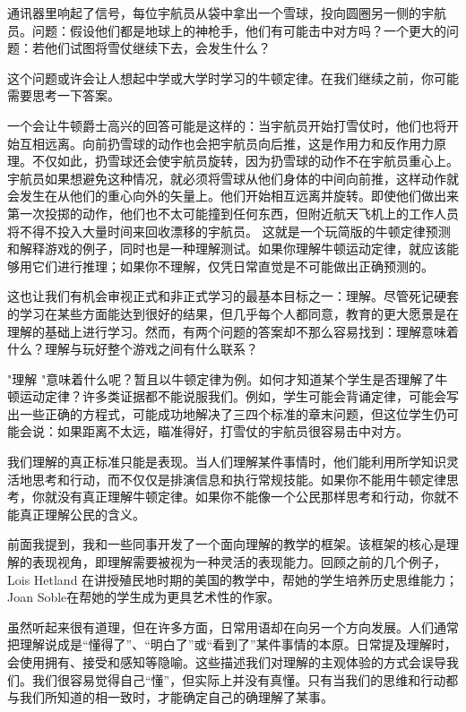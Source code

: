 通讯器里响起了信号，每位宇航员从袋中拿出一个雪球，投向圆圈另一侧的宇航员。问题：假设他们都是地球上的神枪手，他们有可能击中对方吗？一个更大的问题：若他们试图将雪仗继续下去，会发生什么？

这个问题或许会让人想起中学或大学时学习的牛顿定律。在我们继续之前，你可能需要思考一下答案。

一个会让牛顿爵士高兴的回答可能是这样的：当宇航员开始打雪仗时，他们也将开始互相远离。向前扔雪球的动作也会把宇航员向后推，这是作用力和反作用力原理。不仅如此，扔雪球还会使宇航员旋转，因为扔雪球的动作不在宇航员重心上。宇航员如果想避免这种情况，就必须将雪球从他们身体的中间向前推，这样动作就会发生在从他们的重心向外的矢量上。他们开始相互远离并旋转。即使他们做出来第一次投掷的动作，他们也不太可能撞到任何东西，但附近航天飞机上的工作人员将不得不投入大量时间来回收漂移的宇航员。
这就是一个玩简版的牛顿定律预测和解释游戏的例子，同时也是一种理解测试。如果你理解牛顿运动定律，就应该能够用它们进行推理；如果你不理解，仅凭日常直觉是不可能做出正确预测的。

这也让我们有机会审视正式和非正式学习的最基本目标之一：理解。尽管死记硬套的学习在某些方面能达到很好的结果，但几乎每个人都同意，教育的更大愿景是在理解的基础上进行学习。然而，有两个问题的答案却不那么容易找到：理解意味着什么？理解与玩好整个游戏之间有什么联系？

"理解 "意味着什么呢？暂且以牛顿定律为例。如何才知道某个学生是否理解了牛顿运动定律？许多类证据都不能说服我们。例如，学生可能会背诵定律，可能会写出一些正确的方程式，可能成功地解决了三四个标准的章末问题，但这位学生仍可能会说：如果距离不太远，瞄准得好，打雪仗的宇航员很容易击中对方。

我们理解的真正标准只能是表现。当人们理解某件事情时，他们能利用所学知识灵活地思考和行动，而不仅仅是排演信息和执行常规技能。如果你不能用牛顿定律思考，你就没有真正理解牛顿定律。如果你不能像一个公民那样思考和行动，你就不能真正理解公民的含义。

前面我提到，我和一些同事开发了一个面向理解的教学的框架。该框架的核心是理解的表现视角，即理解需要被视为一种灵活的表现能力。回顾之前的几个例子，Lois Hetland 在讲授殖民地时期的美国的教学中，帮她的学生培养历史思维能力；Joan Soble在帮她的学生成为更具艺术性的作家。

虽然听起来很有道理，但在许多方面，日常用语却在向另一个方向发展。人们通常把理解说成是“懂得了”、“明白了”或“看到了”某件事情的本原。日常提及理解时，会使用拥有、接受和感知等隐喻。这些描述我们对理解的主观体验的方式会误导我们。我们很容易觉得自己“懂”，但实际上并没有真懂。只有当我们的思维和行动都与我们所知道的相一致时，才能确定自己的确理解了某事。

